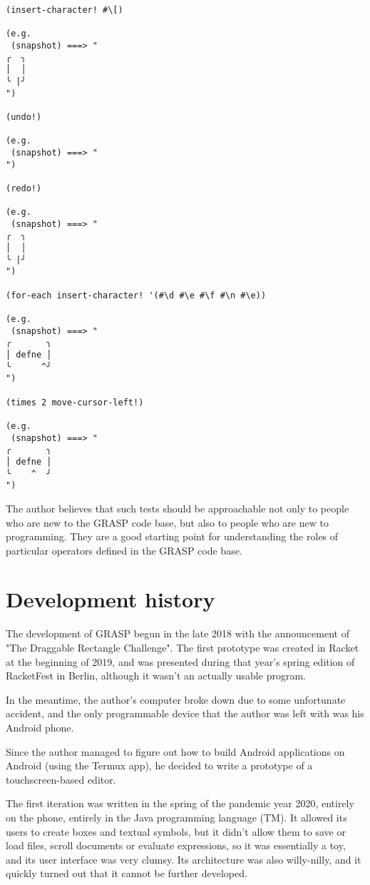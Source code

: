\documentclass[11pt]{article}
\begin{document}
\begin{verbatim}
(insert-character! #\[)

(e.g.
 (snapshot) ===> "
╭  ╮
│  │
╰ |╯
")

(undo!)

(e.g.
 (snapshot) ===> "
")

(redo!)

(e.g.
 (snapshot) ===> "
╭  ╮
│  │
╰ |╯
")

(for-each insert-character! '(#\d #\e #\f #\n #\e))

(e.g.
 (snapshot) ===> "
╭       ╮
│ defne │
╰      ^╯
")

(times 2 move-cursor-left!)

(e.g.
 (snapshot) ===> "
╭       ╮
│ defne │
╰    ^  ╯
")
\end{verbatim}

The author believes that such tests should be
approachable not only to people who are new
to the GRASP code base, but also to people
who are new to programming. They are a good
starting point for understanding the roles
of particular operators defined in the GRASP
code base.

\section{Development history}
\label{sec:orgdc3b0fc}

The development of GRASP begun in the late
2018 with the announcement of "The Draggable
Rectangle Challenge". The first prototype
was created in Racket at the beginning of 2019,
and was presented during that year's spring edition
of RacketFest in Berlin, although it wasn't
an actually usable program.

In the meantime, the author's computer broke
down due to some unfortunate accident, and
the only programmable device that the author
was left with was his Android phone.

Since the author managed to figure out how
to build Android applications on Android
(using the Termux app), he decided to write
a prototype of a touchscreen-based editor.

The first iteration was written in the spring
of the pandemic year 2020, entirely on the phone,
entirely in the Java programming language (TM).
It allowed its users to create boxes and textual
symbols, but it didn't allow them to save or load
files, scroll documents or evaluate expressions,
so it was essentially a toy, and its user
interface was very clumsy. Its architecture
was also willy-nilly, and it quickly turned out
that it cannot be further developed.
\end{document}
